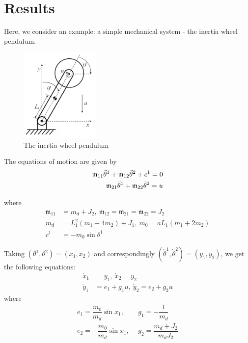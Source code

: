 \chapter{Results}

Here, we consider an example: a simple mechanical system - the inertia wheel pendulum.
\begin{figure}[h]
    \centering
    \includegraphics[width=0.35\textwidth]{../../Figures/inertia_wheel.png}
    \caption{The inertia wheel pendulum}
    \label{fig:inertia-wheel}
\end{figure}
The equations of motion are given by
\begin{equation}
    \begin{split}
        \mathfrak{m}_{11} \Ddot{\theta}^1 + \mathfrak{m}_{12} \Ddot{\theta}^2 + c^1 = 0\\ 
        \mathfrak{m}_{21} \Ddot{\theta}^1 + \mathfrak{m}_{22} \Ddot{\theta}^2 = u
    \end{split}
\end{equation}

where 
\begin{equation*}
    \begin{split}
        \mathfrak{m}_{11} & = m_d + J_2, \
        \mathfrak{m}_{12} = \mathfrak{m}_{21} = \mathfrak{m}_{22}  = J_2 \\
        m_d  & = L_1^2(m_1 + 4 m_2) + J_1, \
        m_0  = a L_1(m_1 + 2m_2) \\
        c^1  & = -m_0 \sin{\theta^1}
    \end{split}
\end{equation*}

Taking $(\theta^1, \theta^2) = (x_1, x_2)$ and correspondingly $(\dot{\theta}^1, \dot{\theta}^2) = (y_1, y_2)$, we get the following equations:
\begin{equation}
\begin{split}
    \dot{x}_1  & = y_1, \
    \dot{x}_2  = y_2 \\
    \dot{y}_1  & = e_1 + g_1 u, \
    \dot{y}_2  = e_2 + g_2 u
\end{split}
\end{equation}
where 
\begin{equation*}
    \begin{split}
        e_1 = \dfrac{m_0}{m_d}\sin{x_1}, & \ \ g_1 = -\dfrac{1}{m_d} \\
        e_2 = -\dfrac{m_0}{m_d} \sin{x_1}, & \ \ g_2 = \dfrac{m_d + J_2}{m_d J_2}
    \end{split}
\end{equation*}

